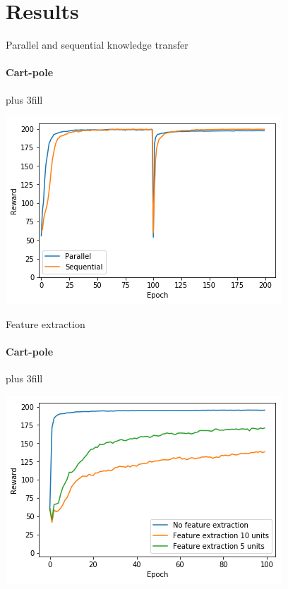\documentclass{beamer}
\begin{document}
\section{Results}
\frame{\sectionpage}
\begin{frame}[fragile]{Parallel and sequential knowledge transfer}
\framesubtitle{Cart-pole}
\vskip0pt plus 3fill
\begin{center}
    \includegraphics[width=.8\linewidth]{results/CartPole/kt_akt/reward_source-target_5tasks.png}
\end{center}
\end{frame}

\begin{frame}[fragile]{Feature extraction}
\framesubtitle{Cart-pole}
\vskip0pt plus 3fill
\begin{center}
    \includegraphics[width=.8\linewidth]{results/CartPole/feature_extraction.png}
\end{center}
\end{frame}
\end{document}
